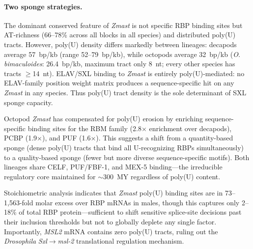 \documentclass[12pt]{article}
\begin{document}
\paragraph{Two sponge strategies.}
The dominant conserved feature of \textit{Zmast} is not specific RBP binding sites
but AT-richness (66--78\% across all blocks in all species)
and distributed poly(U) tracts.
However, poly(U) density differs markedly between lineages:
decapods average 57~bp/kb (range 52--79~bp/kb),
while octopods average 32~bp/kb
(\textit{O. bimaculoides}: 26.4~bp/kb, maximum tract only 8~nt;
every other species has tracts $\geq$14~nt).
ELAV/SXL binding to \textit{Zmast} is entirely poly(U)-mediated:
no ELAV-family position weight matrix produces
a sequence-specific hit on any \textit{Zmast} in any species.
Thus poly(U) tract density is the sole determinant of SXL sponge capacity.

Octopod \textit{Zmast} has compensated for poly(U) erosion
by enriching sequence-specific binding sites
for the RBM family (2.8$\times$ enrichment over decapods),
PCBP (1.9$\times$), and PUF (1.6$\times$).
This suggests a shift from a quantity-based sponge
(dense poly(U) tracts that bind all U-recognizing RBPs simultaneously)
to a quality-based sponge
(fewer but more diverse sequence-specific motifs).
Both lineages share CELF, PUF/FBF-1, and MEX-5 binding---the
irreducible regulatory core maintained for $\sim$300~MY
regardless of poly(U) content.

Stoichiometric analysis indicates that \textit{Zmast} poly(U) binding sites
are in 73--1,563-fold molar excess over RBP mRNAs in males,
though this captures only 2--18\% of total RBP protein---sufficient
to shift sensitive splice-site decisions past their inclusion thresholds
but not to globally deplete any single factor.
Importantly, \textit{MSL2} mRNA contains zero poly(U) tracts,
ruling out the \textit{Drosophila} \textit{Sxl}$\rightarrow$\textit{msl-2}
translational regulation mechanism.
\end{document}
